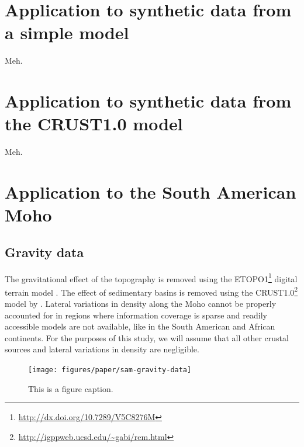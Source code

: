 \documentclass[extra]{gji}
\begin{document}


\section{Application to synthetic data from a simple model}


Meh.


\section{Application to synthetic data from the CRUST1.0 model}

Meh.


\section{Application to the South American Moho}


\subsection{Gravity data}

The gravitational effect of the topography
is removed using the
ETOPO1\footnote{\url{http://dx.doi.org/10.7289/V5C8276M}}
digital terrain model
\citep{amante_c._and_b._w._eakins_etopo1_2009}.
The effect of sedimentary basins is removed using the
CRUST1.0\footnote{\url{http://igppweb.ucsd.edu/~gabi/rem.html}} model
by
\citet{laske_update_2013}.
Lateral variations in density along the Moho cannot be properly accounted for
in regions where information coverage is sparse and readily accessible models
are not available, like in the South American and African continents.
For the purposes of this study, we will assume that all other crustal sources
and lateral variations in density are negligible.


\begin{figure}
    \centering
    \texttt{[image: figures/paper/sam-gravity-data]}
    \caption{This is a figure caption.}
    \label{fig:sam-data}
\end{figure}
\end{document}
